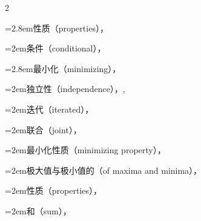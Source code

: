\begin{multicols}{2}
\par\noindent\hangindent=2.8em\hspace*{1.8em}\label{idx:424}性质（properties），\hyperref[exercise:4.2]{\pageref*{exercise:4.2}}\par
\par\noindent\hangindent=2em\hspace*{1em}\label{idx:425}条件（conditional），\hyperref[idxocc:425:154]{\pageref*{idxocc:425:154}}\par
\par\noindent\hangindent=2.8em\hspace*{1.8em}\label{idx:426}最小化（minimizing），\hyperref[exercise:4.13]{\pageref*{exercise:4.13}}\par
\par\noindent\hangindent=2em\hspace*{1em}\label{idx:427}独立性（independence），\hyperref[thm:4.2.10]{\pageref*{thm:4.2.10}}, \hyperref[thm:4.6.6]{\pageref*{thm:4.6.6}}\par
\par\noindent\hangindent=2em\hspace*{1em}\label{idx:428}迭代（iterated），\hyperref[thm:4.4.3]{\pageref*{thm:4.4.3}}\par
\par\noindent\hangindent=2em\hspace*{1em}\label{idx:429}联合（joint），\hyperref[eq:4.6.3]{\pageref*{eq:4.6.3}}\par
\par\noindent\hangindent=2em\hspace*{1em}\label{idx:430}最小化性质（minimizing property），\hyperref[ex:2.2.6]{\pageref*{ex:2.2.6}}\par
\par\noindent\hangindent=2em\hspace*{1em}\label{idx:431}极大值与极小值的（of maxima and minima），\hyperref[exercise:2.15]{\pageref*{exercise:2.15}}\par
\par\noindent\hangindent=2em\hspace*{1em}\label{idx:432}性质（properties），\hyperref[thm:2.2.5]{\pageref*{thm:2.2.5}}\par
\par\noindent\hangindent=2em\hspace*{1em}\label{idx:433}和（sum），\hyperref[lem:5.2.5]{\pageref*{lem:5.2.5}}\par

\end{multicols}
